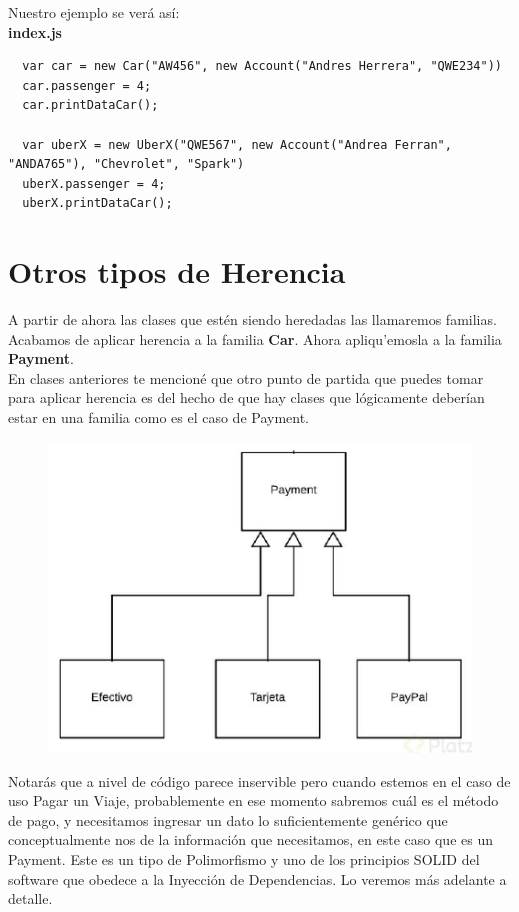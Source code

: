 \documentclass{article}
\begin{document}
Nuestro ejemplo se verá así:\\

\textbf{index.js}
\begin{verbatim}
  var car = new Car("AW456", new Account("Andres Herrera", "QWE234"))
  car.passenger = 4;
  car.printDataCar();

  var uberX = new UberX("QWE567", new Account("Andrea Ferran", "ANDA765"), "Chevrolet", "Spark")
  uberX.passenger = 4;
  uberX.printDataCar();
\end{verbatim}

\section{Otros tipos de Herencia}%
A partir de ahora las clases que estén siendo heredadas las llamaremos
familias.\\

Acabamos de aplicar herencia a la familia \textbf{Car}. Ahora apliqu'emosla a
la familia \textbf{Payment}.\\

En clases anteriores te mencioné que otro punto de partida que puedes tomar
para aplicar herencia es del hecho de que hay clases que lógicamente deberían
estar en una familia como es el caso de Payment.\\

\begin{figure}[h!]
  \centering
  \includegraphics[scale=0.75]{./Pictures/020_otros_tipos_herencia.png}
\end{figure}

Notarás que a nivel de código parece inservible pero cuando estemos en el caso
de uso Pagar un Viaje, probablemente en ese momento sabremos cuál es el método
de pago, y necesitamos ingresar un dato lo suficientemente genérico que
conceptualmente nos de la información que necesitamos, en este caso que es un
Payment. Este es un tipo de Polimorfismo y uno de los principios SOLID del
software que obedece a la Inyección de Dependencias. Lo veremos más adelante a
detalle.\\
\end{document}
